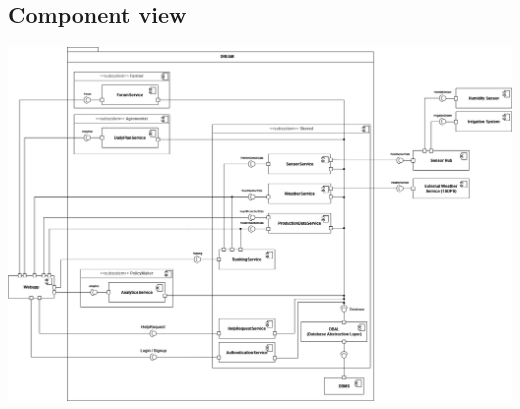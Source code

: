 \documentclass{article}
\begin{document}
\subsection{Component view}\label{Component view}
\includegraphics[width=16.5cm]{diagrams/components_diagram.png}
\end{document}
